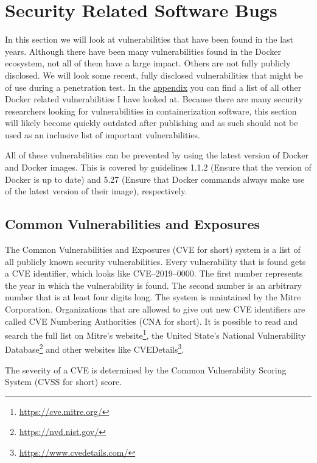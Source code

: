 \section{Security Related Software Bugs}\label{section:bugs}
In this section we will look at vulnerabilities that have been found in the last years. Although there have been many vulnerabilities found in the Docker ecosystem, not all of them have a large impact. Others are not fully publicly disclosed. We will look some recent, fully disclosed vulnerabilities that might be of use during a penetration test. In the \hyperref[appendix:CVE-List]{appendix} you can find a list of all other Docker related vulnerabilities I have looked at.
Because there are many security researchers looking for vulnerabilities in containerization software, this section will likely become quickly outdated after publishing and as such should not be used as an inclusive list of important vulnerabilities.

\hfill

All of these vulnerabilities can be prevented by using the latest version of Docker and Docker images. This is covered by guidelines 1.1.2 (Ensure that the version of Docker is up to date) and 5.27 (Ensure that Docker commands always make use of the latest version of their image), respectively.

\subsection*{Common Vulnerabilities and Exposures}
The Common Vulnerabilities and Exposures (CVE for short) system is a list of all publicly known security vulnerabilities. Every vulnerability that is found gets a CVE identifier, which looks like CVE--2019--0000. The first number represents the year in which the vulnerability is found. The second number is an arbitrary number that is at least four digits long. The system is maintained by the Mitre Corporation. Organizations that are allowed to give out new CVE identifiers are called CVE Numbering Authorities (CNA for short). It is possible to read and search the full list on Mitre's website\footnote{\url{https://cve.mitre.org/}}, the United State's National Vulnerability Database\footnote{\url{https://nvd.nist.gov/}} and other websites like CVEDetails\footnote{\url{https://www.cvedetails.com/}}.

The severity of a CVE is determined by the Common Vulnerability Scoring System (CVSS for short) score.








